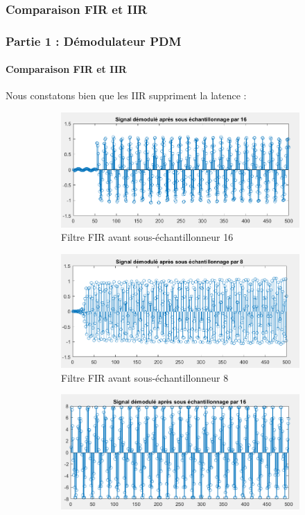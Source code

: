 \documentclass[
10pt,
aspectratio=169,
]{beamer}
\begin{document}
\subsubsection{Comparaison FIR et IIR}
\begin{frame}
\frametitle{Partie 1 : Démodulateur PDM} 
\framesubtitle{Comparaison FIR et IIR}  
Nous constatons bien que les IIR suppriment la latence : 
\begin{figure}
\centering
\begin{subfigure}{0.4\textwidth}
    \includegraphics[scale=0.3]{Images/lat_FIR_16.PNG}
    \caption{Filtre FIR avant sous-échantillonneur 16}
    \label{fig:butt}
\end{subfigure}
\hfill
\begin{subfigure}{0.4\textwidth}
    \includegraphics[scale=0.3]{Images/lat_FIR_8.PNG}
    \caption{Filtre FIR avant sous-échantillonneur 8}
    \label{fig:cheb1}
\end{subfigure}
\hfill
\begin{subfigure}{0.4\textwidth}
    \includegraphics[scale=0.3]{Images/lat_IIR_16.PNG}

\end{subfigure}
\end{figure}
\end{frame}
\end{document}
